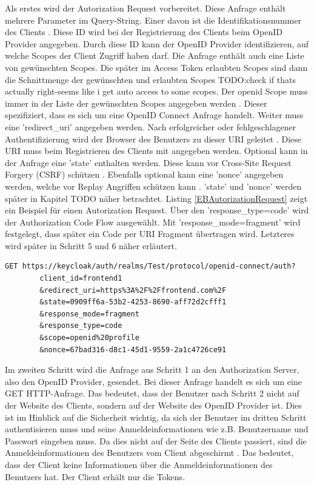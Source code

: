 Als erstes wird der Autorization Request vorbereitet. Diese Anfrage enthält mehrere Parameter im Query-String. Einer davon ist die Identifikationsnummer des Clients \cite{EB14}. Diese ID wird bei der Registrierung des Clients beim OpenID Provider angegeben. Durch diese ID kann der OpenID Provider identifizieren, auf welche Scopes der Client Zugriff haben darf. Die Anfrage enthält auch eine Liste von gewünschten Scopes. Die später im Access Token erlaubten Scopes sind dann die Schnittmenge der gewünschten und erlaubten Scopes TODO:check if thats actually right-seems like i get auto access to some scopes. Der openid Scope muss immer in der Liste der gewünschten Scopes angegeben werden \cite{EB14}. Dieser spezifiziert, dass es sich um eine OpenID Connect Anfrage handelt. Weiter muss eine 'redirect\_uri' angegeben werden. Nach erfolgreicher oder fehlgeschlagener Authentifizierung wird der Browser des Benutzers zu dieser URI geleitet \cite{EB14}. Diese URI muss beim Registrieren des Clients mit angegeben werden. Optional kann in der Anfrage eine 'state' enthalten werden. Diese kann vor Cross-Site Request Forgery (CSRF) schützen \cite{EB14}. Ebenfalls optional kann eine 'nonce' angegeben werden, welche vor Replay Angriffen schützen kann \cite{EB14}. 'state' und 'nonce' werden später in Kapitel TODO näher betrachtet. Listing \ref{EBAutorizationRequest} zeigt ein Beispiel für einen Autorization Request. Über den 'response\_type=code' wird der Authorization Code Flow ausgewählt. Mit 'response\_mode=fragment' wird festgelegt, dass später ein Code per URI Fragment übertragen wird. Letzteres wird später in Schritt 5 und 6 näher erläutert.

\begin{lstlisting}[caption=Beispiel Autorization Request, captionpos=b, label=EBAutorizationRequest]
GET https://keycloak/auth/realms/Test/protocol/openid-connect/auth?
        client_id=frontend1
        &redirect_uri=https%3A%2F%2Ffrontend.com%2F
        &state=0909ff6a-53b2-4253-8690-aff72d2cfff1
        &response_mode=fragment
        &response_type=code
        &scope=openid%20profile
        &nonce=67bad316-d8c1-45d1-9559-2a1c4726ce91
\end{lstlisting}

Im zweiten Schritt wird die Anfrage aus Schritt 1 an den Authorization Server, also den OpenID Provider, gesendet. Bei dieser Anfrage handelt es sich um eine GET HTTP-Anfrage. Das bedeutet, dass der Benutzer nach Schritt 2 nicht auf der Website des Clients, sondern auf der Website des OpenID Provider ist. Dies ist im Hinblick auf die Sicherheit wichtig, da sich der Benutzer im dritten Schritt authentisieren muss und seine Anmeldeinformationen wie z.B. Benutzername und Passwort eingeben muss. Da dies nicht auf der Seite des Clients passiert, sind die Anmeldeinformationen des Benutzers vom Client abgeschirmt \cite{EB15}. Das bedeutet, dass der Client keine Informationen über die Anmeldeinformationen des Benutzers hat. Der Client erhält nur die Tokens.

